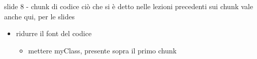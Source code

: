 \documentclass[
  ignorenonframetext,
]{beamer}
\providecommand{\tightlist}{%
  \setlength{\itemsep}{0pt}\setlength{\parskip}{0pt}}
\begin{document}
\begin{frame}{slide 8 - chunk di codice}
\protect\hypertarget{slide-8---chunk-di-codice}{}
ciò che si è detto nelle lezioni precedenti sui chunk vale anche qui,
per le slides

\begin{itemize}
\tightlist
\item
  ridurre il font del codice

  \begin{itemize}
  \tightlist
  \item
    mettere myClass, presente sopra il primo chunk
  \end{itemize}
\end{itemize}
\end{frame}
\end{document}
